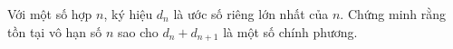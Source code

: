 \ifshowproblem
\begin{problem}\label{example:IND-2015-TST2-P2}
	Với một số hợp $n$, ký hiệu $d_n$ là ước số riêng lớn nhất của $n$.
	Chứng minh rằng tồn tại vô hạn số $n$ sao cho $d_n + d_{n+1}$ là một số chính phương.
\end{problem}
\fi

\footnotemark
{}
\fi